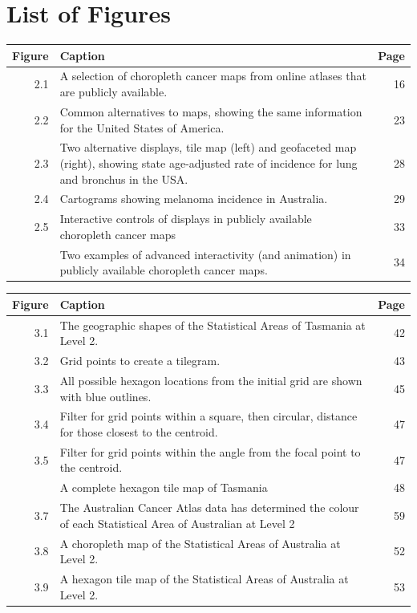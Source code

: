 \documentclass{monashthesis}
\begin{document}
\newpage

\hypertarget{list-of-figures}{%
\chapter*{List of Figures}\label{list-of-figures}}

\begin{tabular}{r>{\raggedright\arraybackslash}p{30em}r}
\toprule
Figure & Caption & Page\\
\midrule
2.1 & A selection of choropleth cancer maps from online atlases that are publicly available. & 16\\
2.2 & Common alternatives to maps, showing the same information for the United States of America. & 23\\
2.3 & Two alternative displays, tile map (left) and geofaceted map (right), showing state age-adjusted rate of incidence for lung and bronchus in the USA. & 28\\
2.4 & Cartograms showing melanoma incidence in Australia. & 29\\
2.5 & Interactive controls of displays in publicly available choropleth cancer maps & 33\\
\addlinespace
2.6 & Two examples of advanced interactivity (and animation) in publicly available choropleth cancer maps. & 34\\
\bottomrule
\end{tabular}

\begin{tabular}{r>{\raggedright\arraybackslash}p{30em}r}
\toprule
Figure & Caption & Page\\
\midrule
3.1 & The geographic shapes of the Statistical Areas of Tasmania at Level 2. & 42\\
3.2 & Grid points to create a tilegram. & 43\\
3.3 & All possible hexagon locations from the initial grid are shown with blue outlines. & 45\\
3.4 & Filter for grid points within a square, then circular, distance for those closest to the centroid. & 47\\
3.5 & Filter for grid points within the angle from the focal point to the centroid. & 47\\
\addlinespace
3.6 & A complete hexagon tile map of Tasmania & 48\\
3.7 & The Australian Cancer Atlas data has determined the colour of each Statistical Area of Australian at Level 2 & 59\\
3.8 & A choropleth map of the Statistical Areas of Australia at Level 2. & 52\\
3.9 & A hexagon tile map of the Statistical Areas of Australia at Level 2. & 53\\
\bottomrule
\end{tabular}
\end{document}
